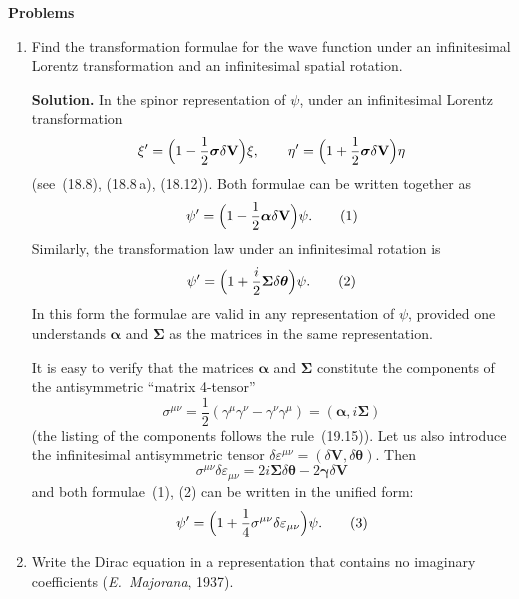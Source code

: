 \begin{center}
\textbf{Problems}
\end{center}

\begin{enumerate}
\item Find the transformation formulae for the wave function under an infinitesimal Lorentz transformation and an infinitesimal spatial rotation.

\textbf{Solution.} In the spinor representation of $\psi$, under an infinitesimal Lorentz transformation
\[
\xi' = \Bigl(1 - \frac{1}{2}\boldsymbol{\sigma}\delta\mathbf{V}\Bigr)\xi,\qquad \eta' = \Bigl(1 + \frac{1}{2}\boldsymbol{\sigma}\delta\mathbf{V}\Bigr)\eta
\]
(see~(18.8), (18.8\,a), (18.12)). Both formulae can be written together as
\begin{equation}
\psi' = \Bigl(1 - \frac{1}{2}\boldsymbol{\alpha}\delta\mathbf{V}\Bigr)\psi.
\tag*{(1)}
\end{equation}
Similarly, the transformation law under an infinitesimal rotation is
\begin{equation}
\psi' = \Bigl(1 + \frac{i}{2}\boldsymbol{\Sigma}\delta\boldsymbol{\theta}\Bigr)\psi.
\tag*{(2)}
\end{equation}
In this form the formulae are valid in any representation of $\psi$, provided one understands $\boldsymbol{\alpha}$ and $\boldsymbol{\Sigma}$ as the matrices in the same representation.

It is easy to verify that the matrices $\boldsymbol{\alpha}$ and $\boldsymbol{\Sigma}$ constitute the components of the antisymmetric ``matrix 4-tensor''
\[
\sigma^{\mu\nu} = \frac{1}{2}(\gamma^\mu\gamma^\nu - \gamma^\nu\gamma^\mu) = (\boldsymbol{\alpha}, i\boldsymbol{\Sigma})
\]
(the listing of the components follows the rule~(19.15)). Let us also introduce the infinitesimal antisymmetric tensor $\delta\varepsilon^{\mu\nu} = (\delta\mathbf{V}, \delta\boldsymbol{\theta})$. Then
\[
\sigma^{\mu\nu}\delta\varepsilon_{\mu\nu} = 2i\boldsymbol{\Sigma}\delta\boldsymbol{\theta} - 2\boldsymbol{\gamma}\delta\mathbf{V}
\]
and both formulae~(1), (2) can be written in the unified form:
\begin{equation}
\psi' = \Bigl(1 + \frac{1}{4}\sigma^{\mu\nu}\delta\varepsilon_{\mu\nu}\Bigr)\psi.
\tag*{(3)}
\end{equation}

\item Write the Dirac equation in a representation that contains no imaginary coefficients (\emph{E.~Majorana}, 1937).


\end{enumerate}
